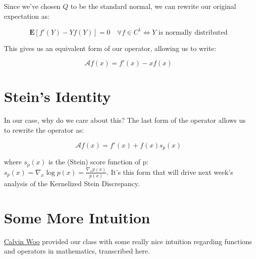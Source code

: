 \documentclass[12pt]{article}
\begin{document}
\noindent Since we've chosen $Q$ to be the standard normal, we can rewrite our original expectation as:

\begin{equation}
    \mathbf{E}[f'(Y) - Yf(Y)] = 0 \quad \forall f \in C^1 \Leftrightarrow Y \text{ is normally distributed}
\end{equation} 

\noindent This gives us an equivalent form of our operator, allowing us to write:

\begin{equation}
    \mathcal{A}f(x) = f'(x) - xf(x)
\end{equation}

\section{Stein's Identity}

In our case, why do we care about this? The last form of the operator allows us to rewrite the operator as:

\begin{equation}
    \mathcal{A}f(x) = f'(x) + f(x)s_p(x)
\end{equation}

where $s_p(x)$ is the (Stein) score function of p: $s_p(x) = \nabla_x \log p(x) = \frac{\nabla_x p(x)}{p(x)}$. It's this form that will drive next week's analysis of the Kernelized Stein Discrepancy. 

\section{Some More Intuition}

\href{}{Calvin Woo} provided our class with some really nice intuition regarding functions and operators in mathematics, transcribed here.


%


\end{document}
